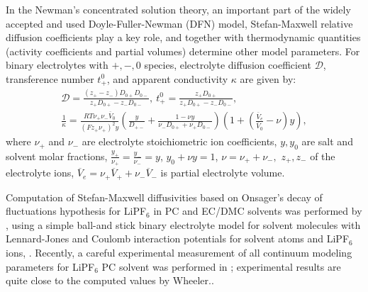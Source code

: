 \documentclass[../main.tex]{subfiles}
\begin{document}
In the Newman's concentrated solution theory, an important part of the widely accepted and used Doyle-Fuller-Newman (DFN)  model,
Stefan-Maxwell relative diffusion coefficients play a key role, and together with thermodynamic quantities (activity coefficients and partial volumes) determine other model parameters. For binary electrolytes with $+,-,0$ species, electrolyte diffusion coefficient $\mathcal{D}$, transference number $t_+^0$, and apparent conductivity $\kappa$ are given by:
\begin{equation} \begin{array}{l}
    \displaystyle \mathcal{D} = \frac{\left( z_+ - z_- \right) D_{0 +}  D_{0 -} }{z_+ D_{0 +} - z_- D_{0 -}}, \
     \displaystyle t_+^0 = \frac{ z_+ D_{0 +}  }{z_+ D_{0 +} - z_- D_{0 -}},
     \\
 \displaystyle \frac{1}{\kappa} = \frac{ R T \nu_+ \nu_- \overline{V}_0}{\left( F z_+ \nu_+\right)^2 y}\left( \frac{y}{D_{+-} } +  \frac{1 - \nu y }{\nu_- D_{0+} + \nu_+ D_{0-}} \right) \left( 1+ \left( \frac{\overline{V}_e}{\overline{V}_0 } - \nu \right) y \right),
    \label{cp diff_def}
\end{array} \end{equation}
\noindent where  $\nu_+$ and $\nu_-$ are electrolyte stoichiometric ion coefficients, $y, y_0$ are salt and solvent molar fractions,  $\frac{y_+}{\nu_+}= \frac{y_-}{\nu_-} =y$, $y_0 + \nu y =1$, $\nu = \nu_+ + \nu_-,$ $z_+, z_-$ of the electrolyte ions, $\overline{V}_e = \nu_+ \overline{V}_+  + \nu_- \overline{V}_-$ is partial electrolyte volume.

Computation of Stefan-Maxwell diffusivities based on Onsager's decay of fluctuations hypothesis for LiPF$_6$ in PC and EC/DMC solvents was performed by \citeauthor{2002PhDWheeler}, using a simple ball-and stick binary electrolyte model for solvent molecules with Lennard-Jones and Coulomb interaction potentials for solvent atoms and LiPF$_6$ ions, \cite{2002PhDWheeler}. Recently, a careful experimental measurement of all continuum modeling parameters for  LiPF$_6$ PC solvent  was performed in \cite{Hou2020}; experimental results are quite close to the computed values by Wheeler.\cite{2002PhDWheeler}.
\end{document}
